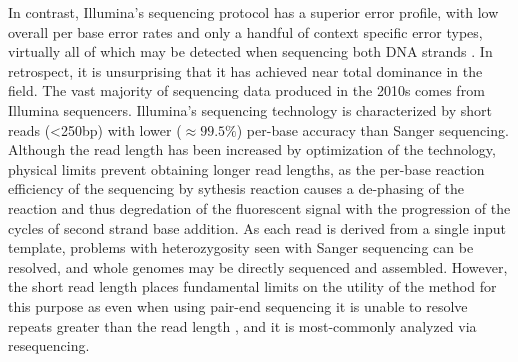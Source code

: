 In contrast, Illumina's sequencing protocol has a superior error profile, with low overall per base error rates and only a handful of context specific error types, virtually all of which may be detected when sequencing both DNA strands \cite{allhoff2013discovering}.
In retrospect, it is unsurprising that it has achieved near total dominance in the field.
The vast majority of sequencing data produced in the 2010s comes from Illumina sequencers.
Illumina's sequencing technology is characterized by short reads (<250bp) with lower ($\approx 99.5\%$) per-base accuracy than Sanger sequencing.
Although the read length has been increased by optimization of the technology, physical limits prevent obtaining longer read lengths, as the per-base reaction efficiency of the sequencing by sythesis reaction causes a de-phasing of the reaction and thus degredation of the fluorescent signal with the progression of the cycles of second strand base addition.
As each read is derived from a single input template, problems with heterozygosity seen with Sanger sequencing can be resolved, and whole genomes may be directly sequenced and assembled.
However, the short read length places fundamental limits on the utility of the method for this purpose as even when using pair-end sequencing it is unable to resolve repeats greater than the read length \cite{alkan2010limitations}, and it is most-commonly analyzed via resequencing.

